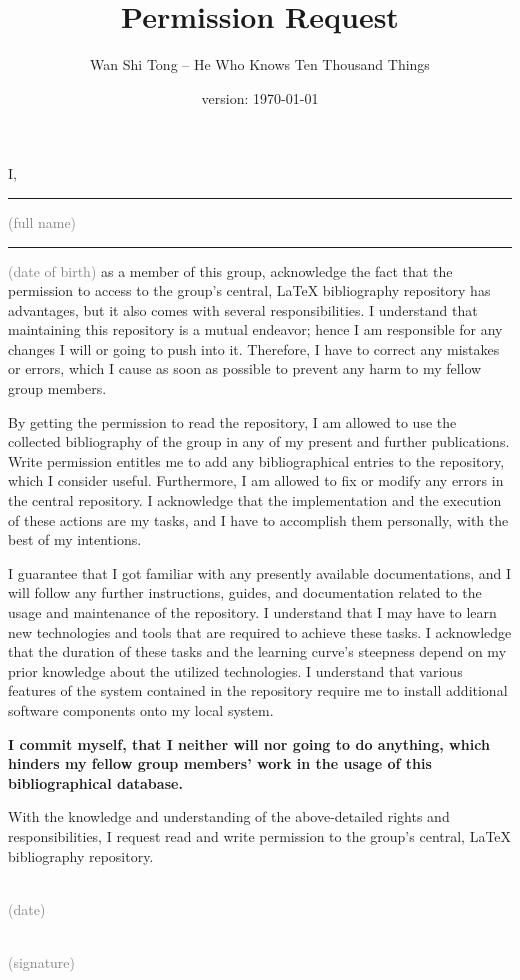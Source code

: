 \documentclass[11pt,a4paper]{article}
\author{Wan Shi Tong -- He Who Knows Ten Thousand Things}
\title{Permission Request}
\date{version: \today}
\begin{document}
\maketitle

I, \rule{15em}{.4pt} \textcolor{gray}{(full name)} \rule{10em}{.4pt} \textcolor{gray}{(date of birth)} as a member of this group, acknowledge the fact that the permission to access to the group's central, \LaTeX{} bibliography repository has advantages, but it also comes with several responsibilities. I understand that maintaining this repository is a mutual endeavor; hence I am responsible for any changes I will or going to push into it. Therefore, I have to correct any mistakes or errors, which I cause as soon as possible to prevent any harm to my fellow group members.

By getting the permission to read the repository, I am allowed to use the collected bibliography of the group in any of my present and further publications. Write permission entitles me to add any bibliographical entries to the repository, which I consider useful. Furthermore, I am allowed to fix or modify any errors in the central repository. I acknowledge that the implementation and the execution of these actions are my tasks, and I have to accomplish them personally, with the best of my intentions. 

I guarantee that I got familiar with any presently available documentations, and I will follow any further instructions, guides, and documentation related to the usage and maintenance of the repository. I understand that I may have to learn new technologies and tools that are required to achieve these tasks. I acknowledge that the duration of these tasks and the learning curve's steepness depend on my prior knowledge about the utilized technologies. I understand that various features of the system contained in the repository require me to install additional software components onto my local system.

\textbf{I commit myself, that I neither will nor going to do anything, which hinders my fellow group members' work in the usage of this bibliographical database.}

With the knowledge and understanding of the above-detailed rights and responsibilities, I request read and write permission to the group's central, \LaTeX{} bibliography repository.\vspace*{10ex}

\parbox{.33\linewidth}{\centering\dotfill\\\textcolor{gray}{(date)}}\hfill
\parbox{.33\linewidth}{\centering\dotfill\\\textcolor{gray}{(signature)}}
\end{document}

